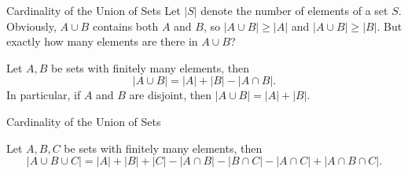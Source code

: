 \begin{frame}{Cardinality of the Union of Sets}
Let $|S|$ denote the number of elements of a set $S$.  Obviously, $A\cup B$ contains both $A$ and $B$, so $|A\cup B|\geq |A|$ and $|A\cup B|\geq |B|$.  But exactly how many elements are there in $A\cup B$?

\begin{theorem} Let $A,B$ be sets with finitely many elements, then
$$|A\cup B|=|A|+|B|-|A\cap B|.$$  In particular, if $A$ and $B$ are disjoint, then $|A\cup B|=|A|+|B|$.
\end{theorem}

\end{frame}


\begin{frame}{Cardinality of the Union of Sets}

\begin{theorem} Let $A,B,C$ be sets with finitely many elements, then
$$|A\cup B \cup C|=|A|+|B|+|C|-|A\cap B|-|B\cap C|-|A\cap C|+|A\cap B \cap C|.$$ 
\end{theorem}
\end{frame}

